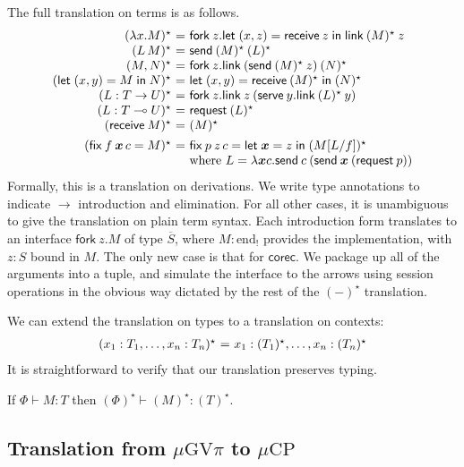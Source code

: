 \documentclass[orivec,envcountsame]{llncs}
\makeatletter
\newcommand{\gvdual}[1]{\overline{#1}}
\newcommand{\lto}{\ensuremath{\multimap}}
\newcommand{\uto}{\ensuremath{\rightarrow}}
\newcommand{\outterm}{\mathrm{end}_!}
\newcommand{\gvtyp}[3]{#1 \vdash #2 : #3}
\newcommand{\mkwd}[1]{\mathsf{#1}}
\newcommand{\gvsend}[2]{\mkwd{send}\:#1\:#2}
\newcommand{\gvreceive}[1]{\mkwd{receive}\:#1}
\newcommand{\gvlet}[3]{\mkwd{let}\;#1 = #2\;\mkwd{in}\;#3}
\newcommand{\gvlink}[2]{\mkwd{link}\:#1\:#2}
\newcommand{\gvfork}[2]{\mkwd{fork}\:#1.#2}
\newcommand{\lrkwd}{\mkwd{fix}}
\newcommand{\gvfix}[3]{\lrkwd\:#1\:#2 = #3}
\newcommand{\gvserve}[2]{\mkwd{serve}\:#1.#2}
\newcommand{\gvrequest}[1]{\mkwd{request}\:#1}
\newcommand{\key}{\mkwd}
\newcommand{\topi}[1]{({#1})^\star}
\newcommand{\mucp}{$\mu\mathrm{CP}$\xspace}
\newcommand{\gvpi}{$\mu\mathrm{GV}\pi$\xspace}
\newcommand{\ba}{\begin{array}}
\newcommand{\ea}{\end{array}}
\newenvironment{equations}{\[\ba{@{}r@{~}c@{~}l@{}}}{\ea\]}
\makeatother
\begin{document}
The full translation on terms is as follows.
\begin{equations}
\topi{\lambda x.M} &=& \gvfork{z}{\gvlet{(x, z)}{\gvreceive{z}}{\gvlink{\topi{M}}{z}}} \\
\topi{L\,M} &=& \gvsend{\topi{M}}{\topi{L}} \\
\topi{M, N} &=&
  \gvfork{z}
    {\gvlink{(\gvsend{\topi{M}}{z})}{\topi{N}}} \\
\topi{\gvlet{(x, y)}{M}{N}} &=&
    \gvlet{(x, y)}{\gvreceive{\topi{M}}}{\topi{N}} \\
\topi{L : T \uto U} &=&
  \gvfork{z}{\gvlink{z}{(\gvserve{y}{\gvlink{\topi{L}}{y}})}} \\
\topi{L : T \lto U} &=& \gvrequest{\topi{L}} \\
\topi{\gvreceive{M}} &=& \topi{M}
\\[1ex]
\topi{\gvfix{f}{\vec{x}\,c}{M}} &=&
  \gvfix{p}{z\,c}{\gvlet{\vec{x}}{z}{\topi{M[L/f]}}} \\
&& \text{where }L = \lambda \vec{x} c.\gvsend{c}{(\gvsend{\vec{x}}{(\gvrequest{p})})} \\
\end{equations}%
Formally, this is a translation on derivations. We write type
annotations to indicate $\to$ introduction and elimination. For all
other cases, it is unambiguous to give the translation on plain term
syntax. Each introduction form translates to an interface
$\gvfork{z}{M}$ of type $\gvdual{S}$, where $M : \outterm$ provides
the implementation, with $z : S$ bound in $M$.
%
The only new case is that for $\key{corec}$. We package up all of the
arguments into a tuple, and simulate the interface to the arrows using
session operations in the obvious way dictated by the rest of the
$\topi{-}$ translation.

We can extend the translation on types to a translation on contexts:
\begin{equations}
\topi{x_1:T_1, \dots, x_n:T_n} &=& x_1:\topi{T_1}, \dots, x_n:\topi{T_n} \\
\end{equations}%
It is straightforward to verify that our translation preserves typing.
\begin{theorem}
If $\gvtyp{\Phi}{M}{T}$ then $\gvtyp{\topi{\Phi}}{\topi{M}}{\topi{T}}$.
\end{theorem}

\subsection{Translation from \gvpi to \mucp}\label{sec:gvpitocp}
\end{document}
